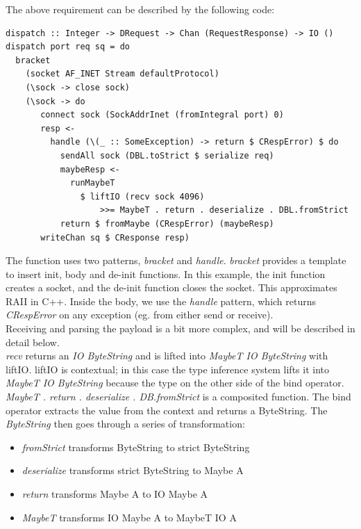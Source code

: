 \documentclass{kdp}
\begin{document}
The above requirement can be described by the following code:

\begin{verbatim}
dispatch :: Integer -> DRequest -> Chan (RequestResponse) -> IO ()
dispatch port req sq = do
  bracket
    (socket AF_INET Stream defaultProtocol)
    (\sock -> close sock)
    (\sock -> do
       connect sock (SockAddrInet (fromIntegral port) 0)
       resp <-
         handle (\(_ :: SomeException) -> return $ CRespError) $ do
           sendAll sock (DBL.toStrict $ serialize req)
           maybeResp <-
             runMaybeT
               $ liftIO (recv sock 4096)
                   >>= MaybeT . return . deserialize . DBL.fromStrict
           return $ fromMaybe (CRespError) (maybeResp)
       writeChan sq $ CResponse resp)
\end{verbatim}

The function uses two patterns, \textit{bracket} and \textit{handle}.
\textit{bracket} provides a template to insert init, body and de-init
functions. In this example, the init function creates a socket, and the de-init
function closes the socket. This approximates RAII in C++. Inside the body, we
use the \textit{handle} pattern, which returns \textit{CRespError} on any
exception (eg. from either send or receive).\\

Receiving and parsing the payload is a bit more complex, and will be described
in detail below.\\

\textit{recv} returns an \textit{IO ByteString} and is lifted into
\textit{MaybeT IO ByteString} with liftIO. liftIO is contextual; in this case
the type inference system lifts it into \textit{MaybeT IO ByteString} because
the type on the other side of the bind operator.\\

\textit{MaybeT . return . deserialize . DB.fromStrict} is a composited function.
The bind operator extracts the value from the context and returns a ByteString.
The \textit{ByteString} then goes through a series of transformation:
\begin{itemize}
    \item \textit{fromStrict} transforms ByteString to strict ByteString
    \item \textit{deserialize} transforms strict ByteString to Maybe A
    \item \textit{return} transforms Maybe A to IO Maybe A
    \item \textit{MaybeT} transforms IO Maybe A to MaybeT IO A
\end{itemize}
\end{document}
